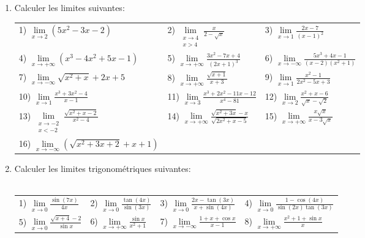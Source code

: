\documentclass[12pt,a4paper]{report}
\begin{document}
	\begin{mybox}{}
		\begin{enumerate}
			\item Calculer les limites suivantes:\\
			\begin{tabular}{lll}
				1) $\lim\limits_{x \to 2}(5x^2-3x-2)$ & 
				2) $\lim\limits_{\substack{x \to 4\\x>4}}\frac{x}{2-\sqrt{x}}$ &
				3) $\lim\limits_{x \to 1}\frac{2x-7}{(x-1)^2}$ \\
				4) $\lim\limits_{x \to +\infty}(x^3-4x^2+5x-1)$ &
				5) $\lim\limits_{x \to +\infty}\frac{3x^2-7x+4}{(2x+1)^3}$ &
				6) $\lim\limits_{x \to -\infty}\frac{5x^3+4x-1}{(x-2)(x^2+1)}$ \\
				7) $\lim\limits_{x \to -\infty}\sqrt{x^2+x}+2x+5$ &
				8) $\lim\limits_{x \to +\infty}\frac{\sqrt{x+1}}{x+3}$ &
				9) $\lim\limits_{x \to 1}\frac{x^2-1}{2x^2-5x+3}$ \\
				10) $\lim\limits_{x \to 1}\frac{x^3+3x^2-4}{x-1}$ &
				11) $\lim\limits_{x \to 3}\frac{x^3+2x^2-11x-12}{x^4-81}$ &
				12) $\lim\limits_{x \to 2}\frac{x^2+x-6}{\sqrt{x}-\sqrt{2}}$\\
				13) $\lim\limits_{\substack{x \to -2\\x<-2}}\frac{\sqrt{x^2+x-2}}{x^2-4}$ &
				14) $\lim\limits_{x \to +\infty}\frac{\sqrt{x^2+3x}-x}{\sqrt{2x^2+x-5}}$ &
				15) $\lim\limits_{x \to +\infty}\frac{x\sqrt{x}}{x-3\sqrt{x}}$ \\
				16) $\lim\limits_{x \to -\infty}(\sqrt{x^2+3x+2}+x+1)$ & &\\
			\end{tabular}
			\item Calculer les limites trigonométriques suivantes:\\
			\\		   
			\begin{tabular}{llll}
				1) $\lim\limits_{x \to 0}\frac{\sin(7x)}{4x}$ & 
				2) $\lim\limits_{x \to 0}\frac{\tan(4x)}{\sin(3x)}$ & 
				3) $\lim\limits_{x \to 0}\frac{2x-\tan(3x)}{x+\sin(4x)}$ &  
				4) $\lim\limits_{x \to 0}\frac{1-\cos(4x)}{\sin(2x)\tan(3x)}$\\
				5) $\lim\limits_{x \to 0}\frac{\sqrt{x+4}-2}{\sin x}$ & 
				6) $\lim\limits_{x \to +\infty}\frac{\sin x}{x^2+1}$ &
				7) $\lim\limits_{x \to -\infty}\frac{1+x+\cos x}{x-1}$ & 
				8) $\lim\limits_{x \to +\infty}\frac{x^2+1+\sin x}{x}$\\
			\end{tabular}%
		\end{enumerate}
	\end{mybox}
	
\end{document}
